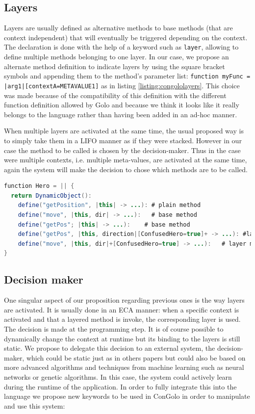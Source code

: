 \documentclass[a4paper]{article}
\begin{document}
\subsection{Layers}
\label{subsection:layers}
Layers are usually defined as alternative methods to base methods (that are context independent) that will eventually be triggered depending on the context. The declaration is done with the help of a keyword such as \lstinline|layer|, allowing to define multiple methods belonging to one layer. In our case, we propose an alternate method definition to indicate layers by using the square bracket symbols and appending them to the method's parameter list: \lstinline!function myFunc = |arg1|[contextA=METAVALUE1]! as in listing \ref{listing:congololayers}. This choice was made because of the compatibility of this definition with the different function definition allowed by Golo and because we think it looks like it really belongs to the language rather than having been added in an ad-hoc manner.

When multiple layers are activated at the same time, the usual proposed way is to simply take them in a LIFO manner as if they were stacked. However in our case the method to be called is chosen by the decision-maker. Thus in the case were multiple contexts, i.e. multiple meta-values, are activated at the same time, again the system will make the decision to chose which methods are to be called.

\begin{lstlisting}[float, language=Java, caption=ConGolo layers example, label={listing:congololayers}]
function Hero = || {
  return DynamicObject():
    define("getPosition", |this| -> ...): # plain method
    define("move", |this, dir| -> ...):   # base method
    define("getPos"; |this| -> ...):    # base method
    define("getPos", |this, direction|[ConfusedHero=true]+ -> ...): #layer declaration, invoked before base method
    define("move", |this, dir|+[ConfusedHero=true] -> ...):   # layer method, invoked after base method
}
\end{lstlisting}

\subsection{Decision maker}
\label{subsection:decisionmaker}

One singular aspect of our proposition regarding previous ones is the way layers are activated. It is usually done in an ECA manner: when a specific context is activated and that a layered method is invoke, the corresponding layer is used. The decision is made at the programming step. It is of course possible to dynamically change the context at runtime but its binding to the layers is still static. We propose to delegate this decision to an external system, the decision-maker, which could be static just as in others papers but could also be based on more advanced algorithms and techniques from machine learning such as neural networks or genetic algorithms. In this case, the system could actively learn during the runtime of the application. In order to fully integrate this into the language we propose new keywords to be used in ConGolo in order to manipulate and use this system:
\end{document}
